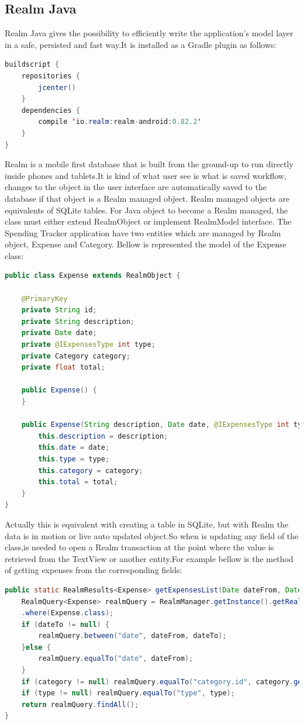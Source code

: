 \subsection{Realm Java}
Realm Java gives the possibility to efficiently write the application's model layer in a safe, persisted and fast way.It is installed as a Gradle plugin as follows:
\begin{lstlisting}[caption={Realm gradle plugin},label={Realm gradle plugin},language = Java]
buildscript {
	repositories {
		jcenter()
	}
	dependencies {
		compile 'io.realm:realm-android:0.82.2'
	}
}	
\end{lstlisting}
Realm is a mobile first database that is built from the ground-up to run directly inside phones and tablets.It is kind of what user see is what is saved workflow, changes to the object in the user interface are automatically saved to the database if that object is a Realm managed object. Realm managed objects are equivalents of SQLite tables. For Java object to become a Realm managed, the class must either extend RealmObject or implement RealmModel interface. The Spending Tracker application have two entities which are managed by Realm object, Expense and Category.
Bellow is represented the model of the Expense class:
\begin{lstlisting}[caption={Realm Expense model},label={Realm expense model},language = Java]
public class Expense extends RealmObject {
	
	@PrimaryKey
	private String id;
	private String description;
	private Date date;
	private @IExpensesType int type;
	private Category category;
	private float total;
	
	public Expense() {
	}
	
	public Expense(String description, Date date, @IExpensesType int type, Category category, float total) {
		this.description = description;
		this.date = date;
		this.type = type;
		this.category = category;
		this.total = total;
	}
}
\end{lstlisting}
Actually this is equivalent with creating a table in SQLite, but with Realm the data is in motion or live auto updated object.So when is updating any field of the class,is needed to open a Realm transaction at the point where the value is retrieved from the TextView or another entity.For example bellow is the method of getting expenses from the corresponding fields:
\begin{lstlisting}[caption={Realm queries example},label={Realm queries example},language = Java]
public static RealmResults<Expense> getExpensesList(Date dateFrom, Date dateTo, @IExpensesType Integer type, Category category) {
	RealmQuery<Expense> realmQuery = RealmManager.getInstance().getRealmInstance()
	.where(Expense.class);
	if (dateTo != null) {
		realmQuery.between("date", dateFrom, dateTo);
	}else {
		realmQuery.equalTo("date", dateFrom);
	}
	if (category != null) realmQuery.equalTo("category.id", category.getId());
	if (type != null) realmQuery.equalTo("type", type);
	return realmQuery.findAll(); 
}
\end{lstlisting}

